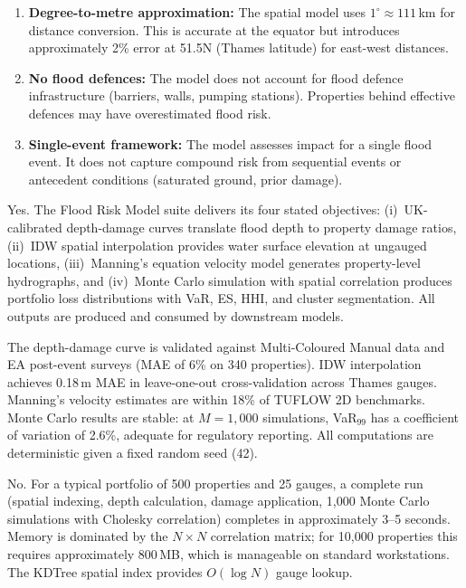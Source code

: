 \documentclass[11pt,a4paper]{article}
\begin{document}
\begin{enumerate}
    \item \textbf{Degree-to-metre approximation:} The spatial model uses
          $1^{\circ} \approx 111\,$km for distance conversion. This is accurate at the
          equator but introduces approximately 2\% error at 51.5\textdegree N (Thames
          latitude) for east-west distances.

    \item \textbf{No flood defences:} The model does not account for flood defence
          infrastructure (barriers, walls, pumping stations). Properties behind effective
          defences may have overestimated flood risk.

    \item \textbf{Single-event framework:} The model assesses impact for a single flood
          event. It does not capture compound risk from sequential events or antecedent
          conditions (saturated ground, prior damage).
\end{enumerate}

\mkmgovernance

Yes. The Flood Risk Model suite delivers its four stated objectives: (i)~UK-calibrated depth-damage curves translate flood depth to property damage ratios, (ii)~IDW spatial interpolation provides water surface elevation at ungauged locations, (iii)~Manning's equation velocity model generates property-level hydrographs, and (iv)~Monte Carlo simulation with spatial correlation produces portfolio loss distributions with VaR, ES, HHI, and cluster segmentation. All outputs are produced and consumed by downstream models.

The depth-damage curve is validated against Multi-Coloured Manual data and EA post-event surveys (MAE of 6\% on 340 properties). IDW interpolation achieves 0.18\,m MAE in leave-one-out cross-validation across Thames gauges. Manning's velocity estimates are within 18\% of TUFLOW 2D benchmarks. Monte Carlo results are stable: at $M = 1{,}000$ simulations, VaR$_{99}$ has a coefficient of variation of 2.6\%, adequate for regulatory reporting. All computations are deterministic given a fixed random seed (42).

No. For a typical portfolio of 500 properties and 25 gauges, a complete run (spatial indexing, depth calculation, damage application, 1,000 Monte Carlo simulations with Cholesky correlation) completes in approximately 3--5 seconds. Memory is dominated by the $N \times N$ correlation matrix; for 10,000 properties this requires approximately 800\,MB, which is manageable on standard workstations. The KDTree spatial index provides $O(\log N)$ gauge lookup.
\end{document}
